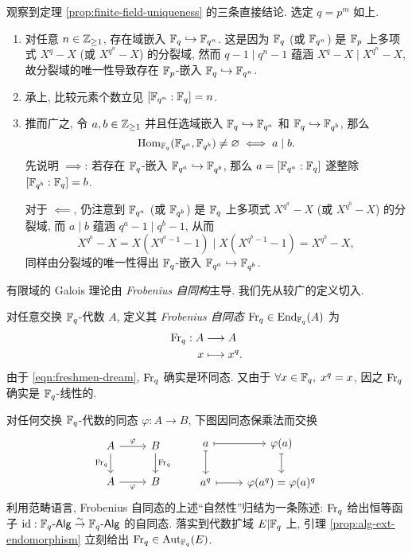 观察到定理 \ref{prop:finite-field-uniqueness} 的三条直接结论. 选定 $q = p^m$ 如上.
\begin{enumerate}
	\item 对任意 $n \in \mathbb{Z}_{\geq 1}$, 存在域嵌入 $\mathbb{F}_q \hookrightarrow \mathbb{F}_{q^n}$. 这是因为 $\mathbb{F}_q$ (或 $\mathbb{F}_{q^n}$) 是 $\mathbb{F}_p$ 上多项式 $X^q - X$ (或 $X^{q^n} - X$) 的分裂域, 然而 $q-1 \mid q^n - 1$ 蕴涵 $X^q - X \mid X^{q^n} - X$, 故分裂域的唯一性导致存在 $\mathbb{F}_p$-嵌入 $\mathbb{F}_q \hookrightarrow \mathbb{F}_{q^n}$.
	\item 承上, 比较元素个数立见 $[\mathbb{F}_{q^n}: \mathbb{F}_q] = n$.
	\item 推而广之, 令 $a, b \in \mathbb{Z}_{\geq 1}$ 并且任选域嵌入 $\mathbb{F}_q \hookrightarrow \mathbb{F}_{q^a}$ 和 $\mathbb{F}_q \hookrightarrow \mathbb{F}_{q^b}$, 那么
	\[ \operatorname{Hom}_{\mathbb{F}_q}(\mathbb{F}_{q^a}, \mathbb{F}_{q^b}) \neq \varnothing \iff a \mid b. \]
	先说明 $\implies$: 若存在 $\mathbb{F}_q$-嵌入 $\mathbb{F}_{q^a} \hookrightarrow \mathbb{F}_{q^b}$, 那么 $a = [\mathbb{F}_{q^a} : \mathbb{F}_q]$ 遂整除 $[\mathbb{F}_{q^b} : \mathbb{F}_q] = b$.

	对于 $\impliedby$, 仍注意到 $\mathbb{F}_{q^a}$ (或 $\mathbb{F}_{q^b}$) 是 $\mathbb{F}_q$ 上多项式 $X^{q^a} - X$ (或 $X^{q^b} - X$) 的分裂域, 而 $a \mid b$ 蕴涵 $q^a - 1 \mid q^b - 1$, 从而
	\[ X^{q^a} - X = X\left( X^{q^a - 1} - 1\right) \mid X\left( X^{q^b - 1} - 1\right) = X^{q^b} - X, \]
	同样由分裂域的唯一性得出 $\mathbb{F}_q$-嵌入 $\mathbb{F}_{q^a} \hookrightarrow \mathbb{F}_{q^b}$.
\end{enumerate}

有限域的 Galois 理论由 \emph{Frobenius 自同构}主导. 我们先从较广的定义切入.
\begin{definition}\label{def:Frob-aut} 
	对任意交换 $\mathbb{F}_q$-代数 $A$, 定义其 \emph{Frobenius 自同态} $\operatorname{Fr}_q \in \operatorname{End}_{\mathbb{F}_q}(A)$ 为
	\begin{align*}
		\operatorname{Fr}_q: A & \longrightarrow A \\
		x & \longmapsto x^q.
	\end{align*}
	由于 \eqref{eqn:freshmen-dream}, $\operatorname{Fr}_q$ 确实是环同态. 又由于 $\forall x \in \mathbb{F}_q, \; x^q=x$, 因之 $\operatorname{Fr}_q$ 确实是 $\mathbb{F}_q$-线性的.
\end{definition}
对任何交换 $\mathbb{F}_q$-代数的同态 $\varphi: A \to B$, 下图因同态保乘法而交换
\[\begin{tikzcd}
	A \arrow[r, "\varphi"] \arrow[d, "\Frob_q"'] & B \arrow[d, "\Frob_q"] \\
	A \arrow[r, "\varphi"'] & B
\end{tikzcd} \qquad \begin{tikzcd}
	a \arrow[mapsto, r] \arrow[mapsto, d] & \varphi(a) \arrow[mapsto, d] \\
	a^q \arrow[mapsto, r] & \varphi(a^q) = \varphi(a)^q
\end{tikzcd}\]
利用范畴语言, Frobenius 自同态的上述``自然性''归结为一条陈述: $\operatorname{Fr}_q$ 给出恒等函子 $\mathrm{id}: \mathbb{F}_q\text{-}\mathsf{Alg} \stackrel{\sim}{\rightarrow} \mathbb{F}_q\text{-}\mathsf{Alg}$ 的自同态. 落实到代数扩域 $E|\mathbb{F}_q$ 上, 引理 \ref{prop:alg-ext-endomorphism} 立刻给出 $\operatorname{Fr}_q \in \operatorname{Aut}_{\mathbb{F}_q}(E)$.

